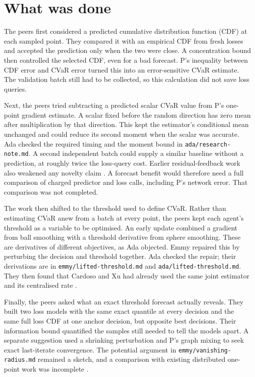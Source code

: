 \documentclass{article}
\begin{document}
\section{What was done}

The peers first considered a predicted cumulative distribution function (CDF) at each sampled point. They
compared it with an empirical CDF from fresh losses and accepted the prediction only when the two were close.
A concentration bound then controlled the selected CDF, even for a bad forecast. P's inequality between CDF
error and CVaR error turned this into an error-sensitive CVaR estimate. The validation batch still had to be
collected, so this calculation did not save loss queries.

Next, the peers tried subtracting a predicted scalar CVaR value from P's one-point gradient estimate. A scalar
fixed before the random direction has zero mean after multiplication by that direction. This kept the
estimator's conditional mean unchanged and could reduce its second moment when the scalar was accurate. Ada
checked the required timing and the moment bound in \texttt{ada/research-note.md}. A second independent batch
could supply a similar baseline without a prediction, at roughly twice the loss-query cost. Earlier
residual-feedback work also weakened any novelty claim \cite{Residual2010,Wang2022Game}. A forecast benefit
would therefore need a full comparison of charged predictor and loss calls, including P's network error. That
comparison was not completed.

The work then shifted to the threshold used to define CVaR. Rather than estimating CVaR anew from a batch at
every point, the peers kept each agent's threshold as a variable to be optimised. An early update combined a
gradient from ball smoothing with a threshold derivative from sphere smoothing. These are derivatives of
different objectives, as Ada objected. Emmy repaired this by perturbing the decision and threshold together.
Ada checked the repair; their derivations are in \texttt{emmy/lifted-threshold.md} and
\texttt{ada/lifted-threshold.md}. They then found that Cardoso and Xu had already used the same joint
estimator and its centralised rate \cite{CardosoXu2019}.

Finally, the peers asked what an exact threshold forecast actually reveals. They built two loss models with
the same exact quantile at every decision and the same full loss CDF at one anchor decision, but opposite best
decisions. Their information bound quantified the samples still needed to tell the models apart. A separate
suggestion used a shrinking perturbation and P's graph mixing to seek exact last-iterate convergence. The
potential argument in \texttt{emmy/vanishing-radius.md} remained a sketch, and a comparison with existing
distributed one-point work was incomplete \cite{LiAssaad2021}.
\end{document}
